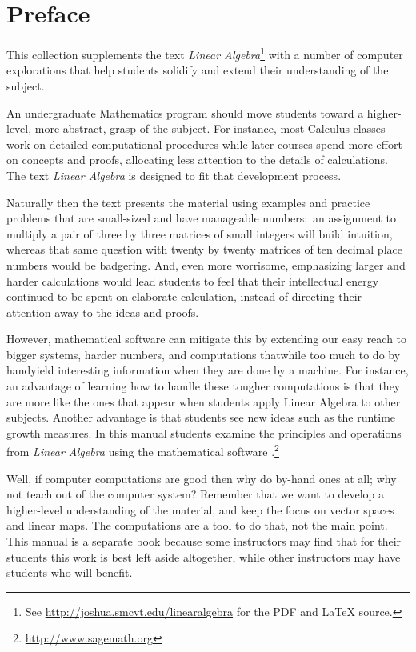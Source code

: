 \chapter*{Preface}\pagestyle{preface}\thispagestyle{preface}


This collection supplements the text \nocite{Hefferon12}
\textit{Linear Algebra}\footnote{See \protect\url{http://joshua.smcvt.edu/linearalgebra} for the PDF and \protect\LaTeX{} source.}
with a number of computer explorations that help students
solidify and extend their understanding of the subject.

An undergraduate Mathematics program should move students 
toward a higher-level, more abstract, grasp of the subject.
For instance, most Calculus classes work on detailed computational procedures
while later courses spend more effort on concepts and proofs, allocating 
less attention to the details of calculations.  
The text \textit{Linear Algebra} is designed to fit 
that development process.

Naturally then the text presents the material 
using examples and practice problems
that are small-sized and have manageable numbers:~an 
assignment to multiply a pair of three by three matrices
of small integers will build intuition, whereas that same 
question with twenty by twenty matrices
of ten decimal place numbers would be badgering. 
And, even more worrisome, emphasizing larger and harder calculations
would lead students to feel that their intellectual energy continued
to be spent on elaborate calculation, instead of directing
their attention away to the ideas and proofs.

However, mathematical software can mitigate this by extending 
our easy reach to bigger systems, harder numbers, and computations 
that\Dash while too much to do by hand\Dash yield
interesting information when they are done by a machine.
For instance, an advantage of learning how to handle these 
tougher computations is that 
they are more like the ones that appear when students apply Linear 
Algebra to other subjects.
Another advantage is that students see new ideas such as 
the runtime growth measures.
In this manual students examine the principles and operations 
from \textit{Linear Algebra} using 
the mathematical software \Sage{}.\footnote{\url{http://www.sagemath.org}}

Well, if computer computations are good then why do by-hand ones at all; why not
teach out of the computer system?
Remember that we want to develop a higher-level understanding of the material, and
keep the focus on vector spaces and linear maps.
The computations are a tool to do that, not the main point.
This manual is a separate book because some instructors may find 
that for their students
this work is best left aside altogether, 
while other instructors may have students who
will benefit.


